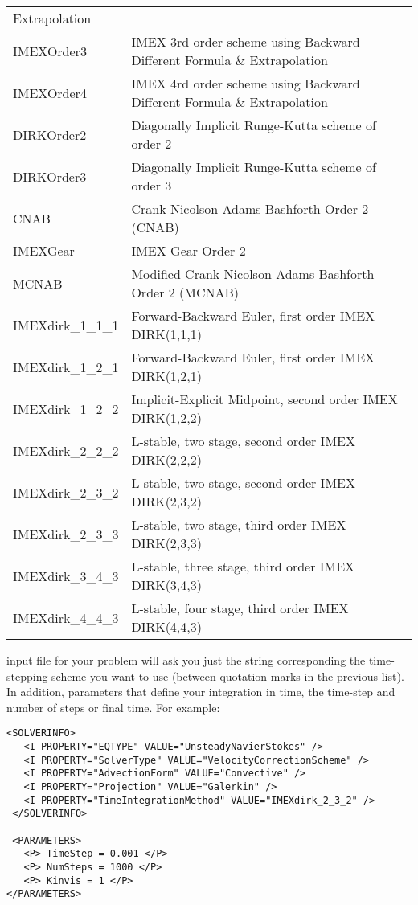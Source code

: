 \begin{center}
\begin{tabular}{p{4cm}p{10cm}}
                       Extrapolation\\
IMEXOrder3           & IMEX 3rd order scheme using Backward Different Formula \&
                       Extrapolation\\
IMEXOrder4           & IMEX 4rd order scheme using Backward Different Formula \&
                       Extrapolation\\
DIRKOrder2           & Diagonally Implicit Runge-Kutta scheme of order 2\\
DIRKOrder3           & Diagonally Implicit Runge-Kutta scheme of order 3\\
CNAB                 & Crank-Nicolson-Adams-Bashforth Order 2 (CNAB)\\
IMEXGear             & IMEX Gear Order 2\\
MCNAB                & Modified Crank-Nicolson-Adams-Bashforth Order 2 (MCNAB)\\
IMEXdirk\_1\_1\_1    & Forward-Backward Euler, first order IMEX DIRK(1,1,1)\\
IMEXdirk\_1\_2\_1    & Forward-Backward Euler, first order IMEX DIRK(1,2,1)\\
IMEXdirk\_1\_2\_2    & Implicit-Explicit Midpoint, second order IMEX DIRK(1,2,2)\\
IMEXdirk\_2\_2\_2    & L-stable, two stage, second order IMEX DIRK(2,2,2)\\
IMEXdirk\_2\_3\_2    & L-stable, two stage, second order IMEX DIRK(2,3,2)\\
IMEXdirk\_2\_3\_3    & L-stable, two stage, third order IMEX DIRK(2,3,3)\\
IMEXdirk\_3\_4\_3    & L-stable, three stage, third order IMEX DIRK(3,4,3)\\
IMEXdirk\_4\_4\_3    & L-stable, four stage, third order IMEX DIRK(4,4,3)\\
\bottomrule
\end{tabular}
\end{center}

{\nek} input file for your problem will ask you just the string
corresponding the time-stepping scheme you want to use (between
quotation marks in the previous list).  In addition, parameters that
define your integration in time, the time-step and number of steps or
final time. For example:\\
\begin{lstlisting}[style=XMLStyle]
<SOLVERINFO>
   <I PROPERTY="EQTYPE" VALUE="UnsteadyNavierStokes" />
   <I PROPERTY="SolverType" VALUE="VelocityCorrectionScheme" />
   <I PROPERTY="AdvectionForm" VALUE="Convective" /> 
   <I PROPERTY="Projection" VALUE="Galerkin" /> 
   <I PROPERTY="TimeIntegrationMethod" VALUE="IMEXdirk_2_3_2" />
 </SOLVERINFO>
 
 <PARAMETERS>
   <P> TimeStep = 0.001 </P> 
   <P> NumSteps = 1000 </P> 
   <P> Kinvis = 1 </P>
</PARAMETERS>
\end{lstlisting}


